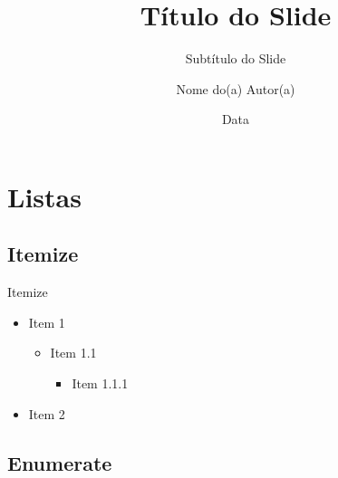 \documentclass[aspectratio=169]{beamer}
\title[Resumo do Título]{Título do Slide} %
\subtitle{Subtítulo do Slide} %
\author{Nome do(a) Autor(a)} %
\date{Data} %
\institute{\textsc{impa} Tech } %
\begin{document}

\maketitle




\section{Listas}


\subsection{Itemize}

\begin{frame}{Itemize}
    \begin{itemize}
        \item Item 1
        \begin{itemize}
            \item Item 1.1
            \begin{itemize}
                \item Item 1.1.1
            \end{itemize}
        \end{itemize}
        \item Item 2
    \end{itemize}
\end{frame}


\subsection{Enumerate}
\end{document}
